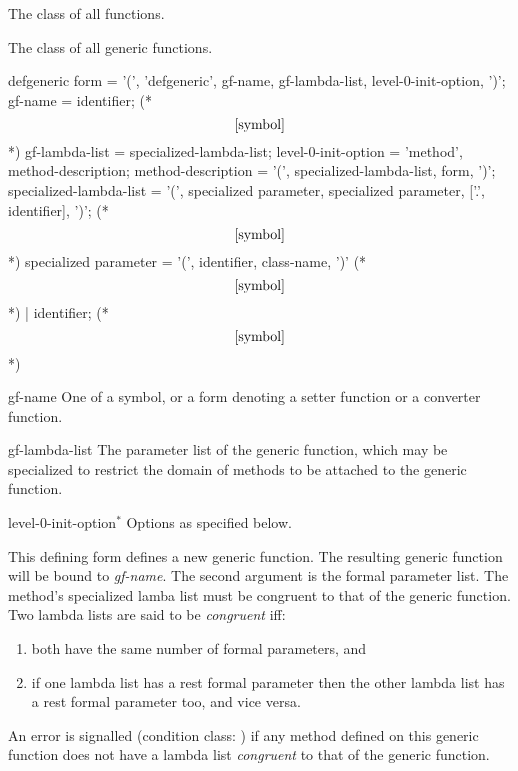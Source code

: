 \begin{optDefinition}
%
%
The class of all functions.

%
The class of all generic functions.

\label{defgeneric-0}
%
\Syntax
\savesyntax{}\vbox{\syntax
defgeneric form
   = '(', 'defgeneric', gf-name, gf-lambda-list,
     {level-0-init-option}, ')';
gf-name
   = identifier;     (* \[\ref{symbol}\] *)
gf-lambda-list
   = specialized-lambda-list;
level-0-init-option
   = 'method', method-description;
method-description
   = '(', specialized-lambda-list, {form}, ')';
specialized-lambda-list
   = '(', specialized parameter,
     {specialized parameter},
     ['.', identifier], ')';     (* \[\ref{symbol}\] *)
specialized parameter
   = '(', identifier, class-name, ')'     (* \[\ref{symbol}\] *)
   | identifier;     (* \[\ref{symbol}\] *)
\endsyntax}
\label{defgeneric-syntax-table}
%
\begin{arguments}
    \item[gf-name] One of a symbol, or a form denoting a setter function or a
    converter function.

    \item[gf-lambda-list] The parameter list of the generic function, which may
    be specialized to restrict the domain of methods to be attached to the
    generic function.

    \item[level-0-init-option\/$^*$\/] Options as specified below.
\end{arguments}
%
\remarks%
This defining form defines a new generic function.  The resulting
generic function will be bound to {\em gf-name}.  The second argument
is the formal parameter list.  The method's specialized lamba list
must be congruent to that of the generic function.  Two lambda lists
are said to be {\em congruent\/} iff:
%
\begin{enumerate}
    \item  both have the same number of formal parameters, and
    \item  if one lambda list has a rest formal parameter then the other
    lambda list has a rest formal parameter too, and vice versa.
\end{enumerate}
%
An error is signalled (condition class:
) if any method defined on this
generic function does not have a lambda list {\em congruent\/} to that of the
generic function.


\end{optDefinition}
